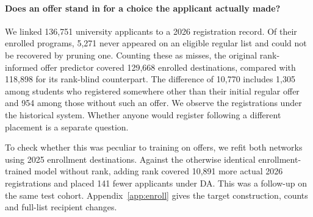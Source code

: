 \paragraph{Does an offer stand in for a choice the applicant actually made?}
We linked 136,751 university applicants to a 2026 registration record. Of their enrolled programs, 5,271 never appeared on an eligible regular list and could not be recovered by pruning one. Counting these as misses, the original rank-informed offer predictor covered 129,668 enrolled destinations, compared with 118,898 for its rank-blind counterpart. The difference of 10,770 includes 1,305 among students who registered somewhere other than their initial regular offer and 954 among those without such an offer. We observe the registrations under the historical system. Whether anyone would register following a different placement is a separate question.

To check whether this was peculiar to training on offers, we refit both networks using 2025 enrollment destinations. Against the otherwise identical enrollment-trained model without rank, adding rank covered 10,891 more actual 2026 registrations and placed 141 fewer applicants under DA. This was a follow-up on the same test cohort. Appendix~\ref{app:enroll} gives the target construction, counts and full-list recipient changes.
